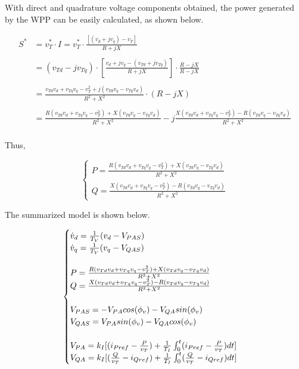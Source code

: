 With direct and quadrature voltage components obtained, the power generated by the WPP can be easily calculated, as shown below.

\begin{align*}
		S^{*} &= v_{T}^{*} \cdot I = v_{T}^{*} \cdot \frac{[(v_{d} + jv_{q}) - v_{T}]}{R + jX} \\
		\\
		&= (v_{Td} - jv_{Tq})\cdot\left[\frac{v_{d} + jv_{q} - (v_{Td} + jv_{Tq})}{R + jX}\right]\cdot \frac{R - jX}{R - jX} \\
		\\
		&= \frac{v_{Td}v_{d} + v_{Tq}v_{q} - v_{T}^{2} + j(v_{Td}v_{q} - v_{Tq}v_{d})}{R^{2} + X^{2}}\cdot (R - jX) \\
		\\
		&= \frac{R(v_{Td}v_{d} + v_{Tq}v_{q} - v_{T}^{2}) + X(v_{Td}v_{q} - v_{Tq}v_{d})}{R^{2} + X^{2}} - j\frac{X(v_{Td}v_{d} + v_{Tq}v_{q} - v_{T}^{2}) - R(v_{Td}v_{q} - v_{Tq}v_{d})}{R^{2} + X^{2}} \\
\end{align*}

Thus,

\begin{equation}
	\begin{cases}
		P = \frac{R(v_{Td}v_{d} + v_{Tq}v_{q} - v_{T}^{2}) + X(v_{Td}v_{q} - v_{Tq}v_{d})}{R^{2} + X^{2}} \\
		Q = \frac{X(v_{Td}v_{d} + v_{Tq}v_{q} - v_{T}^{2}) - R(v_{Td}v_{q} - v_{Tq}v_{d})}{R^{2} + X^{2}}
	\end{cases}
	\label{eq: Outputs}
\end{equation}

The summarized model is shown below.

\begin{equation}
	\begin{cases}
		\dot{v}_{d} = \frac{1}{T_{V}}(v_{d} - V_{PAS}) \\
		\dot{v}_{q} = \frac{1}{T_{V}}(v_{q} - V_{QAS}) \\
		\\
		P = \frac{R(v_{Td}v_{d} + v_{Tq}v_{q} - v_{T}^{2}) + X(v_{Td}v_{q} - v_{Tq}v_{d})}{R^{2} + X^{2}} \\
		Q = \frac{X(v_{Td}v_{d} + v_{Tq}v_{q} - v_{T}^{2}) - R(v_{Td}v_{q} - v_{Tq}v_{d})}{R^{2} + X^{2}} \\
		\\
		V_{PAS} = -V_{PA}cos(\phi_{v}) - V_{QA}sin(\phi_{v}) \\
		V_{QAS} = V_{PA}sin(\phi_{v}) - V_{QA}cos(\phi_{v}) \\
		\\
		V_{PA} = k_{I}[(i_{Pref} - \frac{P}{v_{T}}) + \frac{1}{T_{I}}\int\displaylimits_{0}^{t} (i_{Pref} - \frac{P}{v_{T}})dt]\\
		V_{QA} = k_{I}[(\frac{Q}{v_{T}} - i_{Qref}) + \frac{1}{T_{I}}\int\displaylimits_{0}^{t} (\frac{Q}{v_{T}} - i_{Qref})dt]
	\end{cases}
	\label{eq: Summary}
\end{equation}


